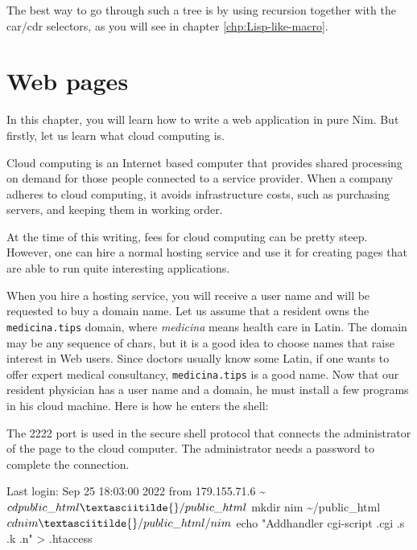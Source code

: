 \documentclass[
  12pt,
]{book}
\newenvironment{Shaded}{}{}
\newcommand{\NormalTok}[1]{#1}
\begin{document}
The best way to go through such a tree is by using recursion together
with the car/cdr selectors, as you will see in chapter
\ref{chp:Lisp-like-macro}.

\chapter{Web pages}\label{web-pages}

In this chapter, you will learn how to write a web application in pure
Nim. But firstly, let us learn what cloud computing is.

Cloud computing is an Internet based computer that provides shared
processing on demand for those people connected to a service provider.
When a company adheres to cloud computing, it avoids infrastructure
costs, such as purchasing servers, and keeping them in working order.

At the time of this writing, fees for cloud computing can be pretty
steep. However, one can hire a normal hosting service and use it for
creating pages that are able to run quite interesting applications.

When you hire a hosting service, you will receive a user name and will
be requested to buy a domain name. Let us assume that a resident owns
the \texttt{medicina.tips} domain, where \emph{medicina} means health
care in Latin. The domain may be any sequence of chars, but it is a good
idea to choose names that raise interest in Web users. Since doctors
usually know some Latin, if one wants to offer expert medical
consultancy, \texttt{medicina.tips} is a good name. Now that our
resident physician has a user name and a domain, he must install a few
programs in his cloud machine. Here is how he enters the shell:

\begin{Shaded}
\end{Shaded}

The 2222 port is used in the secure shell protocol that connects the
administrator of the page to the cloud computer. The administrator needs
a password to complete the connection.

\begin{Shaded}
\begin{Highlighting}[]
\NormalTok{Last login: Sep 25 18:03:00 2022 from 179.155.71.6}
\NormalTok{\textasciitilde{}$ cd public\_html}
\NormalTok{\textasciitilde{}/public\_html$ mkdir nim}
\NormalTok{\textasciitilde{}/public\_html$ cd nim}
\NormalTok{\textasciitilde{}/public\_html/nim$ echo "Addhandler cgi{-}script .cgi .s .k .n" \textgreater{} .htaccess}
\end{Highlighting}
\end{Shaded}
\end{document}
